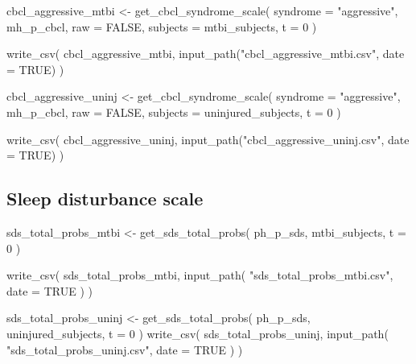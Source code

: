 \documentclass[
  letterpaper,
  DIV=11,
  numbers=noendperiod]{scrreprt}
\newenvironment{Shaded}{\begin{snugshade}}{\end{snugshade}}
\newcommand{\AttributeTok}[1]{\textcolor[rgb]{0.40,0.45,0.13}{#1}}
\newcommand{\ConstantTok}[1]{\textcolor[rgb]{0.56,0.35,0.01}{#1}}
\newcommand{\DecValTok}[1]{\textcolor[rgb]{0.68,0.00,0.00}{#1}}
\newcommand{\FunctionTok}[1]{\textcolor[rgb]{0.28,0.35,0.67}{#1}}
\newcommand{\NormalTok}[1]{\textcolor[rgb]{0.00,0.23,0.31}{#1}}
\newcommand{\OtherTok}[1]{\textcolor[rgb]{0.00,0.23,0.31}{#1}}
\newcommand{\StringTok}[1]{\textcolor[rgb]{0.13,0.47,0.30}{#1}}
\begin{document}
\begin{Shaded}
\begin{Highlighting}[]
\NormalTok{cbcl\_aggressive\_mtbi }\OtherTok{\textless{}{-}} \FunctionTok{get\_cbcl\_syndrome\_scale}\NormalTok{(}
    \AttributeTok{syndrome =} \StringTok{"aggressive"}\NormalTok{,}
\NormalTok{    mh\_p\_cbcl,}
    \AttributeTok{raw =} \ConstantTok{FALSE}\NormalTok{,}
    \AttributeTok{subjects =}\NormalTok{ mtbi\_subjects,}
    \AttributeTok{t =} \DecValTok{0}
\NormalTok{)}

\FunctionTok{write\_csv}\NormalTok{(}
\NormalTok{    cbcl\_aggressive\_mtbi,}
    \FunctionTok{input\_path}\NormalTok{(}\StringTok{"cbcl\_aggressive\_mtbi.csv"}\NormalTok{, }\AttributeTok{date =} \ConstantTok{TRUE}\NormalTok{)}
\NormalTok{)}

\NormalTok{cbcl\_aggressive\_uninj }\OtherTok{\textless{}{-}} \FunctionTok{get\_cbcl\_syndrome\_scale}\NormalTok{(}
    \AttributeTok{syndrome =} \StringTok{"aggressive"}\NormalTok{,}
\NormalTok{    mh\_p\_cbcl,}
    \AttributeTok{raw =} \ConstantTok{FALSE}\NormalTok{,}
    \AttributeTok{subjects =}\NormalTok{ uninjured\_subjects,}
    \AttributeTok{t =} \DecValTok{0}
\NormalTok{)}

\FunctionTok{write\_csv}\NormalTok{(}
\NormalTok{    cbcl\_aggressive\_uninj,}
    \FunctionTok{input\_path}\NormalTok{(}\StringTok{"cbcl\_aggressive\_uninj.csv"}\NormalTok{, }\AttributeTok{date =} \ConstantTok{TRUE}\NormalTok{)}
\NormalTok{)}
\end{Highlighting}
\end{Shaded}

\subsection{Sleep disturbance scale}\label{sleep-disturbance-scale}

\begin{Shaded}
\begin{Highlighting}[]
\NormalTok{sds\_total\_probs\_mtbi }\OtherTok{\textless{}{-}} \FunctionTok{get\_sds\_total\_probs}\NormalTok{(}
\NormalTok{    ph\_p\_sds,}
\NormalTok{    mtbi\_subjects,}
    \AttributeTok{t =} \DecValTok{0}
\NormalTok{)}

\FunctionTok{write\_csv}\NormalTok{(}
\NormalTok{    sds\_total\_probs\_mtbi,}
    \FunctionTok{input\_path}\NormalTok{(}
        \StringTok{"sds\_total\_probs\_mtbi.csv"}\NormalTok{,}
        \AttributeTok{date =} \ConstantTok{TRUE}
\NormalTok{    )}
\NormalTok{)}

\NormalTok{sds\_total\_probs\_uninj }\OtherTok{\textless{}{-}} \FunctionTok{get\_sds\_total\_probs}\NormalTok{(}
\NormalTok{    ph\_p\_sds,}
\NormalTok{    uninjured\_subjects,}
    \AttributeTok{t =} \DecValTok{0}
\NormalTok{)}
\FunctionTok{write\_csv}\NormalTok{(}
\NormalTok{    sds\_total\_probs\_uninj,}
    \FunctionTok{input\_path}\NormalTok{(}
        \StringTok{"sds\_total\_probs\_uninj.csv"}\NormalTok{,}
        \AttributeTok{date =} \ConstantTok{TRUE}
\NormalTok{    )}
\NormalTok{)}
\end{Highlighting}
\end{Shaded}
\end{document}
